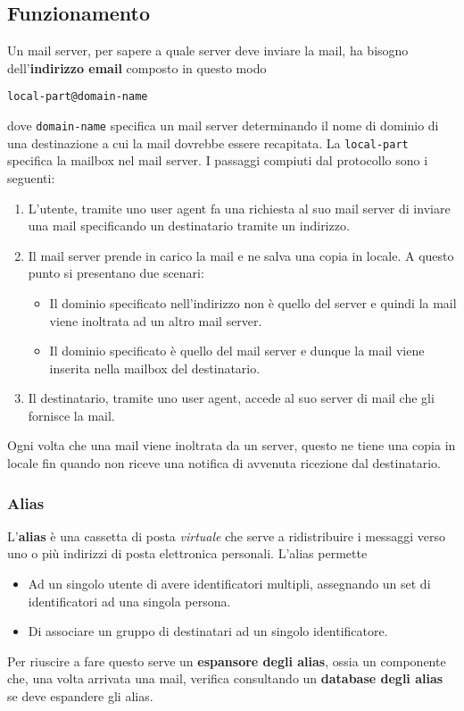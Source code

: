 \subsection{Funzionamento}
Un mail server, per sapere a quale server deve inviare la mail, ha bisogno dell'\textbf{indirizzo
email} composto in questo modo
\begin{center} \verb|local-part@domain-name| \end{center}
dove \verb|domain-name| specifica un mail server determinando il nome di dominio di una
destinazione a cui la mail dovrebbe essere recapitata. La \verb|local-part| specifica la mailbox
nel mail server. I passaggi compiuti dal protocollo sono i seguenti:
\begin{enumerate}
	\item L'utente, tramite uno user agent fa una richiesta al suo mail server di inviare una mail
		specificando un destinatario tramite un indirizzo.
	\item Il mail server prende in carico la mail e ne salva una copia in locale. A questo punto
		si presentano due scenari:
		\begin{itemize}
			\item Il dominio specificato nell'indirizzo non è quello del server e quindi la mail
				viene inoltrata ad un altro mail server.
			\item Il dominio specificato è quello del mail server e dunque la mail viene inserita
				nella mailbox del destinatario.
		\end{itemize}
	\item Il destinatario, tramite uno user agent, accede al suo server di mail che gli fornisce
		la mail.
\end{enumerate}
Ogni volta che una mail viene inoltrata da un server, questo ne tiene una copia in locale fin
quando non riceve una notifica di avvenuta ricezione dal destinatario.

\subsubsection{Alias}
L'\textbf{alias} è una cassetta di posta \emph{virtuale} che serve a ridistribuire i messaggi
verso uno o più indirizzi di posta elettronica personali. L'alias permette
\begin{itemize}
	\item Ad un singolo utente di avere identificatori multipli, assegnando un set di
		identificatori ad una singola persona.
	\item Di associare un gruppo di destinatari ad un singolo identificatore.
\end{itemize}
Per riuscire a fare questo serve un \textbf{espansore degli alias}, ossia un componente che, una 
volta arrivata una mail, verifica consultando un \textbf{database degli alias} se deve espandere
gli alias.

